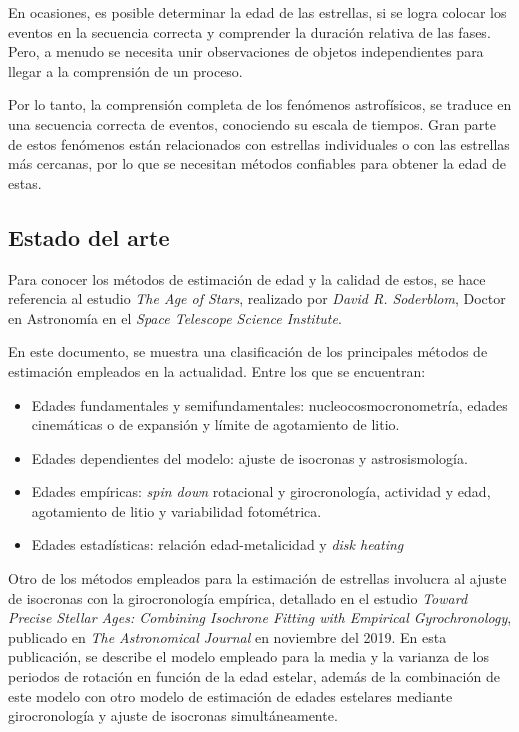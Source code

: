 \documentclass[12pt,oneside,a4paper]{article}
\begin{document}
En ocasiones, es posible determinar la edad de las estrellas, si se logra colocar los eventos en la secuencia correcta y comprender la duración relativa de las fases. Pero, a menudo se necesita unir observaciones de objetos independientes para llegar a la comprensión de un proceso.

Por lo tanto, la comprensión completa de los fenómenos astrofísicos, se traduce en una secuencia correcta de eventos, conociendo su escala de tiempos. Gran parte de estos fenómenos están relacionados con estrellas individuales o con las estrellas más cercanas, por lo que se necesitan métodos confiables para obtener la edad de estas.


\subsection{Estado del arte}
Para conocer los métodos de estimación de edad y la calidad de estos, se hace referencia al estudio \textit{The Age of Stars}, realizado por \textit{David R. Soderblom}, Doctor en Astronomía en el \textit{Space Telescope Science Institute}. \cite{Soderblom2010}

En este documento, se muestra una clasificación de los principales métodos de estimación empleados en la actualidad. Entre los que se encuentran:
\begin{itemize}
\item Edades fundamentales y semifundamentales: nucleocosmocronometría, edades cinemáticas o de expansión y límite de agotamiento de litio.
\item Edades dependientes del modelo: ajuste de isocronas y astrosismología.
\item Edades empíricas: \textit{spin down} rotacional y girocronología, actividad y edad, agotamiento de litio y variabilidad fotométrica.
\item Edades estadísticas: relación edad-metalicidad y \textit{disk heating}
\end{itemize}

Otro de los métodos empleados para la estimación de estrellas involucra al ajuste de isocronas con la girocronología empírica, detallado en el estudio \textit{Toward Precise Stellar Ages: Combining Isochrone Fitting with Empirical
Gyrochronology}, publicado en \textit{The Astronomical Journal} en noviembre del 2019. En esta publicación, se describe el modelo empleado para la media y la varianza de los periodos de rotación en función de la edad estelar, además de la combinación de este modelo con otro modelo de estimación de edades estelares mediante girocronología y ajuste de isocronas simultáneamente. \cite{Angus2019}
\end{document}
